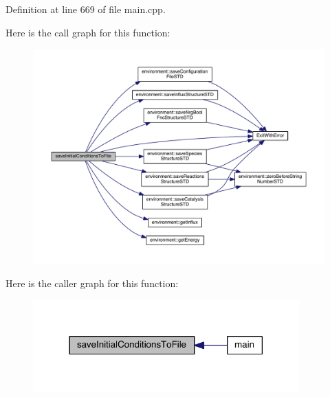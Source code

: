 Definition at line 669 of file main.\-cpp.



Here is the call graph for this function\-:\nopagebreak
\begin{figure}[H]
\begin{center}
\leavevmode
\includegraphics[width=350pt]{a00089_a4665c5f33b43dfc8fae4757552028cc0_cgraph}
\end{center}
\end{figure}




Here is the caller graph for this function\-:\nopagebreak
\begin{figure}[H]
\begin{center}
\leavevmode
\includegraphics[width=290pt]{a00089_a4665c5f33b43dfc8fae4757552028cc0_icgraph}
\end{center}
\end{figure}


